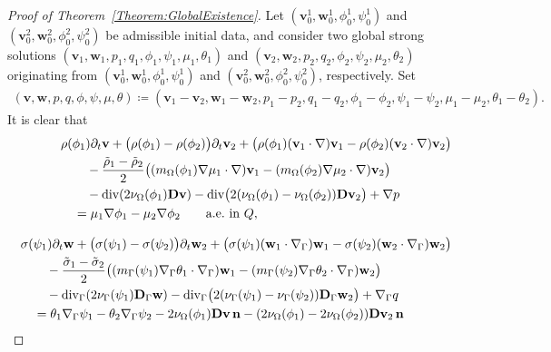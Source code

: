 \documentclass[10pt,reqno]{amsart}
\theoremstyle{remark}
\numberwithin{equation}{section}
\newcommand{\n}{\mathbf{n}}
\newcommand{\bv}{\mathbf{v}}
\newcommand{\bw}{\mathbf{w}}
\newcommand{\D}{\mathbf{D}}
\newcommand{\Dg}{\mathbf{D}_\Gamma}
\newcommand{\delt}{\partial_{t}}
\newcommand{\Grad}{\nabla}
\newcommand{\Div}{\textnormal{div}}
\newcommand{\Gradg}{\nabla_\Ga}
\newcommand{\Divg}{\textnormal{div}_\Ga}
\newcommand{\Om}{\Omega}
\newcommand{\Ga}{\Gamma}
\begin{document}
\begin{proof}[Proof of Theorem~\ref{Theorem:GlobalExistence}]
Let $(\bv_0^1,\bw_0^1,\phi_0^1,\psi_0^1)$ and $(\bv_0^2,\bw_0^2,\phi_0^2,\psi_0^2)$ be admissible initial data, and consider two global strong solutions $(\bv_1,\bw_1,p_1,q_1,\phi_1,\psi_1,\mu_1,\theta_1)$ and $(\bv_2,\bw_2,p_2,q_2,\phi_2,\psi_2,\mu_2,\theta_2)$ originating from $(\bv_0^1,\bw_0^1,\phi_0^1,\psi_0^1)$ and $(\bv_0^2,\bw_0^2,\phi_0^2,\psi_0^2)$, respectively. Set
\begin{align*}
    (\bv,\bw,p,q,\phi,\psi,\mu,\theta) \coloneqq (\bv_1 - \bv_2, \bw_1 - \bw_2, p_1 - p_2, q_1 - q_2, \phi_1 - \phi_2, \psi_1 - \psi_2, \mu_1 - \mu_2, \theta_1 - \theta_2).
\end{align*}
It is clear that 
\begin{subequations}
    \begin{align}\label{Uniq:v1-v2}
        \begin{split}
            &\rho(\phi_1)\delt\bv + \big(\rho(\phi_1) - \rho(\phi_2)\big)\delt\bv_2 + \big(\rho(\phi_1)(\bv_1\cdot\Grad)\bv_1 - \rho(\phi_2)(\bv_2\cdot\Grad)\bv_2\big) \\
            &\qquad - \frac{\tilde\rho_1 - \tilde\rho_2}{2}\big((m_\Om(\phi_1)\Grad\mu_1\cdot\Grad)\bv_1 - (m_\Om(\phi_2)\Grad\mu_2\cdot\Grad)\bv_2\big) \\
            &\qquad - \Div(2\nu_\Om(\phi_1)\D\bv) - \Div\big(2(\nu_\Om(\phi_1) - \nu_\Om(\phi_2))\D\bv_2\big) + \Grad p \\
            &\quad = \mu_1\Grad\phi_1 - \mu_2\Grad\phi_2 \qquad\text{a.e.~in~}Q,
        \end{split}
        \\[8pt]
        \begin{split}\label{Uniq:w1-w2}
            &\sigma(\psi_1)\delt\bw + \big(\sigma(\psi_1) - \sigma(\psi_2)\big)\delt\bw_2 + \big(\sigma(\psi_1)(\bw_1\cdot\Gradg)\bw_1 - \sigma(\psi_2)(\bw_2\cdot\Gradg)\bw_2\big) \\
            &\qquad - \frac{\tilde\sigma_1 - \tilde\sigma_2}{2}\big((m_\Ga(\psi_1)\Gradg\theta_1\cdot\Gradg)\bw_1 - (m_\Ga(\psi_2)\Gradg\theta_2\cdot\Gradg)\bw_2\big) \\
            &\qquad - \Divg(2\nu_\Ga(\psi_1)\Dg\bw) - \Divg\big(2(\nu_\Ga(\psi_1) - \nu_\Ga(\psi_2))\Dg\bw_2\big) + \Gradg q \\
            &\quad = \theta_1\Gradg\psi_1 - \theta_2\Gradg\psi_2 - 2\nu_\Om(\phi_1)\D\bv\,\n - (2\nu_\Om(\phi_1) - 2\nu_\Om(\phi_2))\D\bv_2\,\n \\

\end{split}
\end{align}
\end{subequations}
\end{proof}
\end{document}
